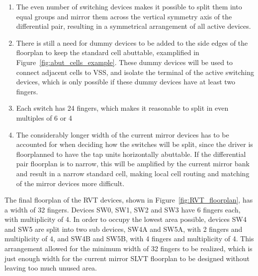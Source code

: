 \begin{enumerate}
	\item The even number of switching devices makes it possible to split them into equal groups and mirror them across the vertical symmetry axis of the differential pair, resulting in a symmetrical arrangement of all active devices.
	\item There is still a need for dummy devices to be added to the side edges of the floorplan to keep the standard cell abuttable, examplified in Figure~\ref{fig:abut_cells_example}. These dummy devices will be used to connect adjacent cells to VSS, and isolate the terminal of the active switching devices, which is only possible if these dummy devices have at least two fingers.
	\item Each switch has 24 fingers, which makes it reasonable to split in even multiples of 6 or 4 
	\item The considerably longer width of the current mirror devices has to be accounted for when deciding how the switches will be split, since the driver is floorplanned to have the tap units horizontally abuttable. If the differential pair floorplan is to narrow, this will be amplified by the current mirror bank and result in a narrow standard cell, making local cell routing and matching of the mirror devices more difficult.
\end{enumerate}
 
The final floorplan of the \ac{RVT} devices, shown in Figure~\ref{fig:RVT_floorplan}, has a width of 32 fingers. Devices SW0, SW1, SW2 and SW3 have 6 fingers each, with multiplicity of 4. In order to occupy the lowest area possible, devices SW4 and SW5 are split into two sub devices, SW4A and SW5A, with 2 fingers and multiplicity of 4, and SW4B and SW5B, with 4 fingers and multiplicity of 4. This arrangement allowed for the minimum width of 32 fingers to be realized, which is just enough width for the current mirror \ac{SLVT} floorplan to be designed without leaving too much unused area.

